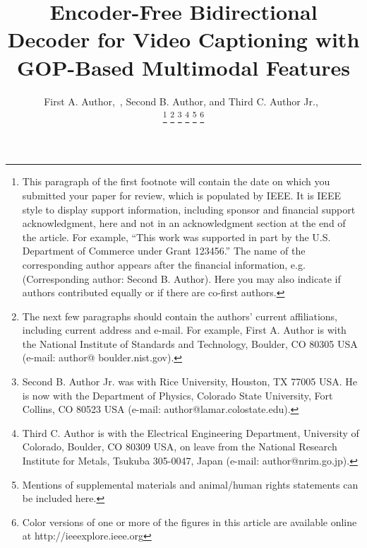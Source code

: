 \documentclass[lettersize,journal]{IEEEtran}
\begin{document}
\title{{\fontsize{24}{28}\selectfont Encoder-Free Bidirectional Decoder for Video Captioning with GOP-Based Multimodal Features}}


\author{First A. Author,~, Second B. Author, and Third C. Author Jr.,~

\thanks{This paragraph of the first footnote will contain the date on which you submitted your paper for review, which is populated by IEEE. It is IEEE style to display support information, including sponsor and financial support acknowledgment, here and not in an acknowledgment section at the end of the article. For example, “This work was supported in part by the U.S. Department of Commerce under Grant 123456.” The name of the corresponding author appears after the financial information, e.g. (Corresponding author: Second B. Author). Here you may also indicate if authors contributed equally or if there are co-first authors.}%
\thanks{The next few paragraphs should contain the authors’ current affiliations, including current address and e-mail. For example, First A. Author is with the National Institute of Standards and Technology, Boulder, CO 80305 USA (e-mail: author@ boulder.nist.gov).}%
\thanks{Second B. Author Jr. was with Rice University, Houston, TX 77005 USA. He is now with the Department of Physics, Colorado State University, Fort Collins, CO 80523 USA (e-mail: author@lamar.colostate.edu).}%
\thanks{Third C. Author is with the Electrical Engineering Department, University of Colorado, Boulder, CO 80309 USA, on leave from the National Research Institute for Metals, Tsukuba 305-0047, Japan (e-mail: author@nrim.go.jp).}%
\thanks{Mentions of supplemental materials and animal/human rights statements can be included here.}%
\thanks{Color versions of one or more of the figures in this article are available online at http://ieeexplore.ieee.org}}
\end{document}
